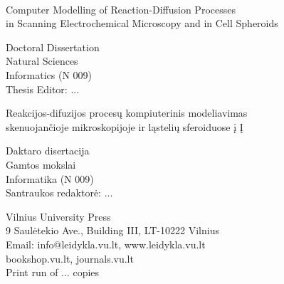 \pagestyle{empty}

\iffalse   
\begin{center}   %
NOTES
\end{center}
\newpage
\fi

\cleardoublepage



\vspace{165mm}

\begin{flushleft}
\thesisAuthorName \ \thesisAuthorSurname
	
Computer Modelling of Reaction-Diffusion Processes\\ 
in Scanning Electrochemical Microscopy and in Cell Spheroids

Doctoral Dissertation\\
Natural Sciences\\
Informatics (N 009)\\
Thesis Editor: ...


\vspace{3cm}

Reakcijos-difuzijos procesų kompiuterinis modeliavimas\\
skenuojančioje mikroskopijoje ir ląstelių sferoiduose į Į

Daktaro disertacija\\
Gamtos mokslai\\
Informatika (N 009)\\
Santraukos redaktorė: ...


\end{flushleft}




\vspace{165mm}

{
	\vspace*{\fill}
	
	\centering
Vilnius University Press\\
9 Saulėtekio Ave., Building III, LT-10222 Vilnius\\
Email: info@leidykla.vu.lt, www.leidykla.vu.lt\\
bookshop.vu.lt, journals.vu.lt \\
Print run of ... copies\\
}
